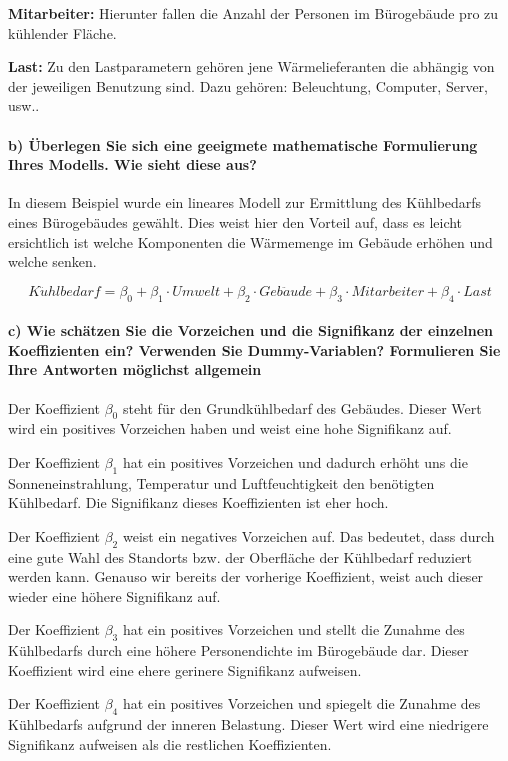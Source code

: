 \documentclass{eegreport}
\begin{document}
\textbf{Mitarbeiter:} Hierunter fallen die Anzahl der Personen im Bürogebäude pro zu kühlender Fläche.  

\textbf{Last:} Zu den Lastparametern gehören jene Wärmelieferanten die abhängig von der jeweiligen Benutzung sind. Dazu gehören: Beleuchtung, Computer, Server, usw.. 

\paragraph{b) Überlegen Sie sich eine geeigmete mathematische Formulierung Ihres Modells. Wie sieht diese aus?}
\mbox{}\newline \newline
In diesem Beispiel wurde ein lineares Modell zur Ermittlung des Kühlbedarfs eines Bürogebäudes gewählt. Dies weist hier den Vorteil auf, dass es leicht ersichtlich ist welche Komponenten die Wärmemenge im Gebäude erhöhen und welche senken.

\begin{equation}
K\ddot{u}hlbedarf = \beta_0 + \beta_1 \cdot Umwelt + \beta_2 \cdot Geb\ddot{a}ude + \beta_3 \cdot Mitarbeiter + \beta_4 \cdot Last 
\end{equation}

\paragraph{c) Wie schätzen Sie die Vorzeichen und die Signifikanz der einzelnen Koeffizienten ein? Verwenden Sie Dummy-Variablen? Formulieren Sie Ihre Antworten möglichst allgemein}
\mbox{}\newline \newline
Der Koeffizient $\beta_0$ steht für den Grundkühlbedarf des Gebäudes. Dieser Wert wird ein positives Vorzeichen haben und weist eine hohe Signifikanz auf.

Der Koeffizient $\beta_1$ hat ein positives Vorzeichen und dadurch erhöht uns die Sonneneinstrahlung, Temperatur und Luftfeuchtigkeit den benötigten Kühlbedarf. Die Signifikanz dieses Koeffizienten ist eher hoch.

Der Koeffizient $\beta_2$ weist ein negatives Vorzeichen auf. Das bedeutet, dass durch eine gute Wahl des Standorts bzw. der Oberfläche der Kühlbedarf reduziert werden kann. Genauso wir bereits der vorherige Koeffizient, weist auch dieser wieder eine höhere Signifikanz auf.

Der Koeffizient $\beta_3$ hat ein positives Vorzeichen und stellt die Zunahme des Kühlbedarfs durch eine höhere Personendichte im Bürogebäude dar. Dieser Koeffizient wird eine ehere gerinere Signifikanz aufweisen.

Der Koeffizient $\beta_4$ hat ein positives Vorzeichen und spiegelt die Zunahme des Kühlbedarfs aufgrund der inneren Belastung. Dieser Wert wird eine niedrigere Signifikanz aufweisen als die restlichen Koeffizienten.


\newpage
\appendix


\newpage

\listoffigures   
\listoftables
\end{document}

